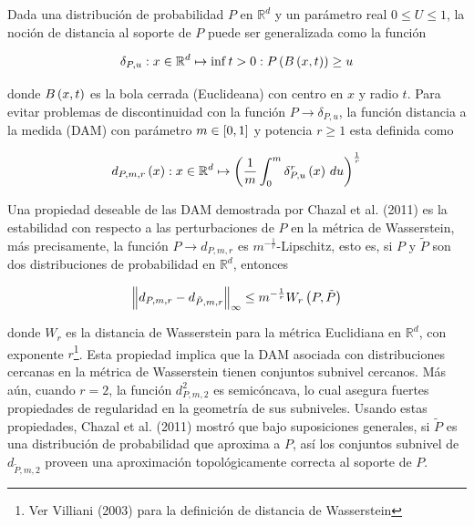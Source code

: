 Dada una distribuci\'on de probabilidad $P$ en $\mathbb{R}^{d}$ y un par\'ametro real $0\leq U\leq 1$,
la noci\'on de distancia al soporte de $P$ puede ser generalizada como la funci\'on

\begin{equation*}
    \delta_{P,u}:x\in\mathbb{R}^{d}\mapsto\inf{t>0:P\left(B\left(x,t\right)\right)\geq u}
\end{equation*}

donde $B\left(x,t\right)$ es la bola cerrada (Euclideana) con centro en $x$ y radio $t$. Para evitar problemas
de discontinuidad con la funci\'on $P\rightarrow \delta_{P,u}$, la funci\'on distancia a la medida (DAM)
con par\'ametro $m\in\left[0,1\right]$ y potencia $r\geq 1$ esta definida como

\begin{equation}
    d_{P,m,r}\left(x\right):
    x\in\mathbb{R}^{d}\mapsto\left(\frac{1}{m}\int_{0}^{m}\delta_{P,u}^{r}\left(x\right)\,du\right)^{\frac{1}{r}}
\end{equation}

\par Una propiedad deseable de las DAM demostrada por Chazal et al. (2011)\cite{Chazal2011b} es la
estabilidad con respecto a las perturbaciones de $P$ en la m\'etrica de Wasserstein, m\'as precisamente,
la funci\'on $P\rightarrow d_{P,m,r}$ es $m^{-\frac{1}{r}}$-Lipschitz, esto es, si $P$ y $\tilde{P}$ son
dos distribuciones de probabilidad en $\mathbb{R}^{d}$, entonces

\begin{equation}
    \left\|d_{P,m,r}-d_{\tilde{P},m,r}\right\|_{\infty}\leq m^{-\frac{1}{r}}W_{r}\left(P,\tilde{P}\right)
\end{equation}

donde $W_{r}$ es la distancia de Wasserstein para la m\'etrica Euclidiana en $\mathbb{R}^{d}$, con
exponente $r$\footnote{Ver Villiani (2003)\cite{Villiani2003} para la definici\'on de distancia de
Wasserstein}. Esta propiedad implica que la DAM asociada con distribuciones cercanas en la m\'etrica de
Wasserstein tienen conjuntos subnivel cercanos. M\'as a\'un, cuando $r=2$, la funci\'on
$d_{P,m,2}^{2}$ es semic\'oncava, lo cual asegura fuertes propiedades de regularidad en la
geometr\'ia de sus subniveles. Usando estas propiedades, Chazal et al. (2011) \cite{Chazal2011b} mostr\'o
que bajo suposiciones generales, si $\tilde{P}$ es una distribuci\'on de probabilidad que aproxima a $P$,
as\'i los conjuntos subnivel de $d_{\tilde{P},m,2}$ proveen una aproximaci\'on topol\'ogicamente
correcta al soporte de $P$.

